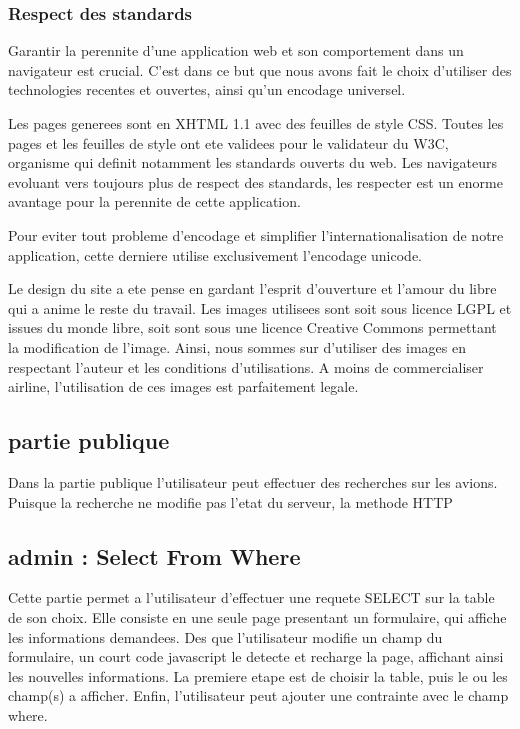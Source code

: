 \subsubsection{Respect des standards}
Garantir la perennite d'une application web et son comportement dans un navigateur est crucial. C'est dans ce but que nous avons fait le choix d'utiliser des technologies recentes et ouvertes, ainsi qu'un encodage universel.

Les pages generees sont en XHTML 1.1 avec des feuilles de style CSS. Toutes les pages et les feuilles de style ont ete validees pour le validateur du W3C, organisme qui definit notamment les standards ouverts du web. Les navigateurs evoluant vers toujours plus de respect des standards, les respecter est un enorme avantage pour la perennite de cette application.

Pour eviter tout probleme d'encodage et simplifier l'internationalisation de notre application, cette derniere utilise exclusivement l'encodage unicode.

Le design du site a ete pense en gardant l'esprit d'ouverture et l'amour du libre qui a anime le reste du travail. Les images utilisees sont soit sous licence LGPL et issues du monde libre, soit sont sous une licence Creative Commons permettant la modification de l'image. Ainsi, nous sommes sur d'utiliser des images en respectant l'auteur et les conditions d'utilisations. A moins de commercialiser airline, l'utilisation de ces images est parfaitement legale.

\subsection{partie publique}
Dans la partie publique l'utilisateur peut effectuer des recherches sur les avions. Puisque la recherche ne modifie pas l'etat du serveur, la methode HTTP

\subsection{admin : Select From Where}
Cette partie permet a l'utilisateur d'effectuer une requete SELECT sur la table de son choix. Elle consiste en une seule page presentant un formulaire, qui affiche les informations demandees. Des que l'utilisateur modifie un champ du formulaire, un court code javascript le detecte et recharge la page, affichant ainsi les nouvelles informations. La premiere etape est de choisir la table, puis le ou les champ(s) a afficher. Enfin, l'utilisateur peut ajouter une contrainte avec le champ where.

